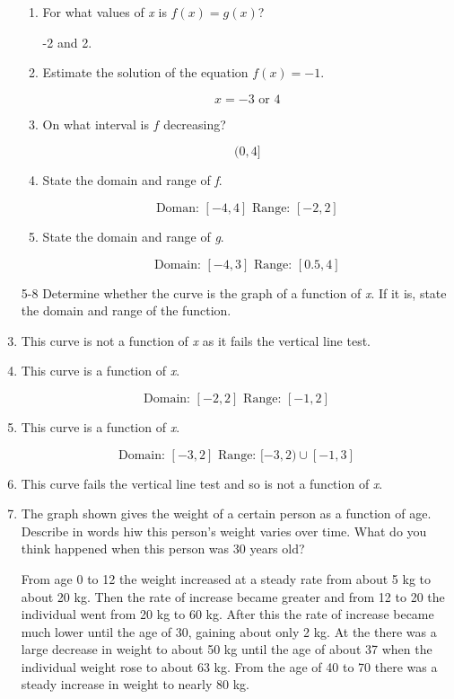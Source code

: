 \documentclass{article}
\begin{document}
\begin{enumerate}
\begin{enumerate}
			\item For what values of \emph{x} is $f(x) = g(x)$?
			
				-2 and 2.
				
			\item Estimate the solution of the equation $f(x) = -1$.
			
				$$x = -3 \text{ or } 4$$
			
			\item On what interval is $f$ decreasing?
			
				$$(0, 4]$$
				
			\item State the domain and range of \emph{f}.
			
				$$ \text{Doman: } [-4, 4] \text{ Range: } [-2, 2 ]$$
				
			\item State the domain and range of \emph{g}.
			
				$$ \text{Domain: } [-4, 3] \text{ Range: } [0.5, 4]$$
		\end{enumerate}
		
		\item[5-8] Determine whether the curve is the graph of a function of \emph{x}. If
			it is, state the domain and range of the function.
			
		\item This curve is not a function of \emph{x} as it fails the vertical line test.
		
		\item This curve is a function of \emph{x}.
		
			$$ \text{Domain: } [ -2, 2] \text{ Range: } [-1, 2]$$
			
		\item This curve is a function of \emph{x}.
		
			$$ \text{Domain: } [-3, 2] \text{ Range: } [-3, 2) \cup [-1, 3]$$
			
		\item This curve fails the vertical line test and so is not a function of \emph{x}.
		
		\item The graph shown gives the weight of a certain person as a function of age.
			Describe in words hiw this person's weight varies over time. What do you think
			happened when this person was 30 years old?
			
			From age 0 to 12 the weight increased at a steady rate from about 5 kg to about
			20 kg. Then the rate of increase became greater and from 12 to 20 the individual
			went from 20 kg to 60 kg. After this the rate of increase became much lower until 
			the age of 30, gaining about only 2 kg. At the there was a large decrease in weight
			to about 50 kg until the age of about 37 when the individual weight rose to about 63 kg.
			From the age of 40 to 70 there was a steady increase in weight to nearly 80 kg.
			

\end{enumerate}
\end{document}
